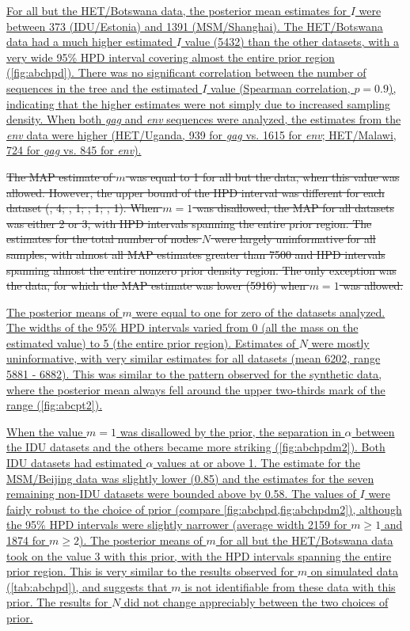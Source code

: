 \documentclass[12pt]{article}\usepackage[]{graphicx}\usepackage[]{color}
\let\mref\cref
\let\mciteauthor\citeauthor
\renewcommand{\cref}[1]{\mbox{\mref{#1}}}
\renewcommand{\citeauthor}[1]{\mbox{\mciteauthor{#1}}}
\newcommand{\add}[1]{\color{blue} \uline{#1} \color{black}}
\newcommand{\del}[1]{\color{red} \sout{#1} \color{black}}
\begin{document}
\add{For all but the HET/Botswana data, the posterior mean estimates for
$I$ were between
    373
(IDU/Estonia) and
    1391
(MSM/Shanghai). The HET/Botswana data had a much higher estimated $I$ value
    (5432)
than the other datasets, with a very wide 95\% HPD interval covering almost the
entire prior region (\cref{fig:abchpd}). There was no significant correlation
between the number of sequences in the tree and the estimated $I$ value
(Spearman correlation, 
    $p =0.9$),
indicating that the higher estimates were not simply due to increased sampling
density. When both \textit{gag} and \textit{env} sequences were analyzed, the
estimates from the \textit{env} data were higher (HET/Uganda,
    939 for \textit{gag} vs.
    1615 for \textit{env};
HET/Malawi,
    724 for \textit{gag} vs.
    845 for \textit{env}).}

\del{The MAP estimate of $m$ was equal to 1 for all but the
\citeauthor{novitsky2014impact} data, when this value was allowed. However, the
upper bound of the HPD interval was different for each dataset
  (\citeauthor{niculescu2015recent}, 4;
   \citeauthor{wang2015targeting}, 1;
   \citeauthor{li2015hiv}, 1;
   \citeauthor{cuevas2009hiv}, 1).
When $m = 1$ was disallowed, the MAP for all datasets was either 2 or 3, with
HPD intervals spanning the entire prior region. The estimates for the total
number of nodes $N$ were largely uninformative for all samples, with almost all
MAP estimates greater than 7500 and HPD intervals spanning almost the entire
nonzero prior density region. The only exception was the \citeauthor{li2015hiv}
data, for which the MAP estimate was lower 
  (5916)
when $m = 1$ was allowed.}

\add{The posterior means of $m$ were equal to one for 
  zero
of the datasets analyzed. The widths of the 95\% HPD intervals varied from 0
(all the mass on the estimated value) to 5 (the entire prior region). Estimates
of $N$ were  mostly uninformative, with very similar estimates for all datasets
(mean
    6202,
range
    5881 - 6882).
This was similar to the pattern observed for the synthetic data, where the
posterior mean always fell around the upper two-thirds mark of the range
(\cref{fig:abcpt2}).}

\add{When the value $m = 1$ was disallowed by the prior, the separation in
$\alpha$ between the IDU datasets and the others became more striking
(\cref{fig:abchpdm2}). Both IDU datasets had estimated $\alpha$ values at or
above
    1.
The estimate for the MSM/Beijing data was slightly lower
    (0.85) and
the estimates for the seven remaining non-IDU datasets were bounded above by
    0.58. 
The values of $I$ were fairly robust to the choice of prior (compare
\cref{fig:abchpd,fig:abchpdm2}), although the 95\% HPD intervals were slightly
narrower (average width
    2159
for $m \geq 1$ and
    1874
for $m \geq 2$). The posterior means of $m$ for all but the HET/Botswana data
took on the value 3 with this prior, with the HPD intervals spanning the entire
prior region. This is very similar to the results observed for $m$ on simulated
data (\cref{tab:abchpd}), and suggests that $m$ is not identifiable from these
data with this prior. The results for $N$ did not change appreciably between
the two choices of prior.}
\end{document}

